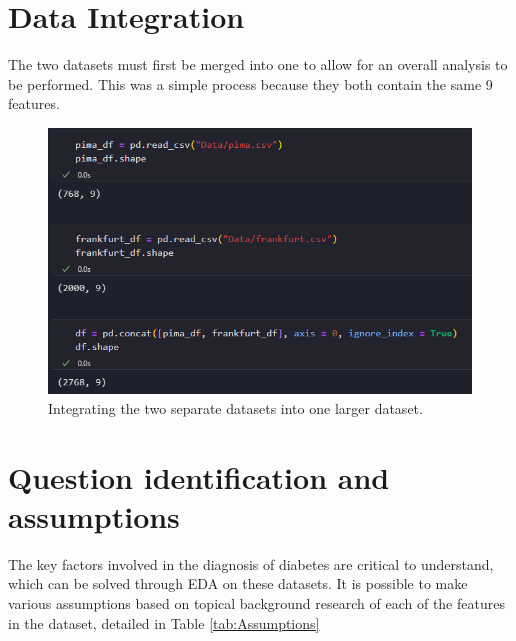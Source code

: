 \documentclass[12pt]{report}
\begin{document}
\section{Data Integration}
The two datasets must first be merged into one to allow for an overall analysis to be performed.
This was a simple process because they both contain the same 9 features.

\begin{figure}[H]
    \centering
    \includegraphics[width=\linewidth]{Integration.png}
    \caption{Integrating the two separate datasets into one larger dataset.}
    \label{fig:Integration}
\end{figure}

\pagebreak 

\section{Question identification and assumptions}
The key factors involved in the diagnosis of diabetes are critical to understand, which 
can be solved through EDA on these datasets. It is possible to make various assumptions based 
on topical background research of each of the features in the dataset, detailed in Table \ref{tab:Assumptions}
\end{document}
